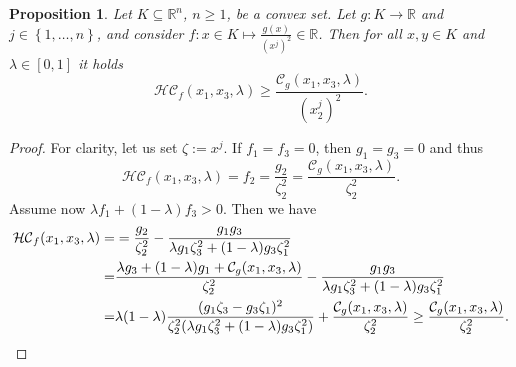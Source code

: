 \documentclass[11pt, reqno]{amsart}
\newtheorem{proposition}[lemma]{Proposition}
\theoremstyle{definition}
\numberwithin{equation}{section}
\newcommand{\R}{\mathbb{R}}
\begin{document}
\begin{proposition}\label{prop_prel_gxj}
	Let $K\subseteq \R^n$, $n\geq 1$, be a convex set. Let $g\colon K\to \R$ 
	and $j\in \left\{1,\dots,n\right\}$, and consider $f\colon x \in K \mapsto \frac{g(x)}{(x^j)^{2}} \in \R$. Then for all $x,y\in K$ and $\lambda\in[0,1]$ it holds
	\[ 	\mathcal{HC}_{f}(x_1,x_3,\lambda)\geq \frac{\mathcal{C}_g(x_1,x_3,\lambda)}{(x_2^j)^2} .\]
\end{proposition}
\begin{proof}
	For clarity, let us set $\zeta:=x^j$. 
	If $f_1=f_3=0$, then $g_1=g_3=0$ and thus
	$$\mathcal{HC}_{f}(x_1,x_3,\lambda) = f_2 = \frac{g_2}{\zeta_2^2} = \frac{\mathcal{C}_g(x_1,x_3,\lambda)}{\zeta_2^2}.$$
	Assume now $\lambda f_1+(1-\lambda) f_3>0$. Then we have
	\begin{align*}
		\mathcal{HC}_{f}(x_1,x_3,\lambda)=&
		=\frac{g_2}{\zeta^2_2}-\frac{g_1g_3}{\lambda g_1 \zeta_3^2+(1-\lambda)g_3 \zeta_1^2}\\=&
		\frac{\lambda g_3+(1-\lambda)g_1 + \mathcal{C}_g(x_1,x_3,\lambda)}{\zeta^2_2}-\frac{g_1g_3}{\lambda g_1 \zeta_3^2+(1-\lambda)g_3 \zeta_1^2}\\=& \lambda(1-\lambda)\frac{(g_1 \zeta_3-g_3 \zeta_1)^2}{\zeta_2^2(\lambda g_1 \zeta_3^2+(1-\lambda)g_3 \zeta_1^2)}+\frac{\mathcal{C}_g(x_1,x_3,\lambda)}{\zeta_2^2}\geq \frac{\mathcal{C}_g(x_1,x_3,\lambda)}{\zeta_2^2}.\qedhere
	\end{align*}
\end{proof}
\end{document}
